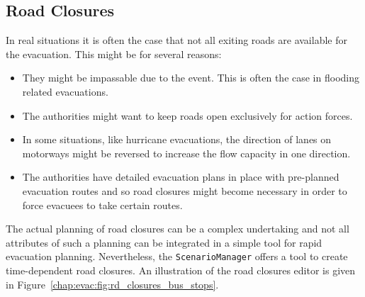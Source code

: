 \subsection{Road Closures}
In real situations it is often the case that not all exiting roads are available for the evacuation. This might be for several reasons:
\begin{itemize}
\item They might be impassable due to the event. This is often the case in flooding related evacuations.
\item The authorities might want to keep roads open exclusively for action forces.
\item In some situations, like hurricane evacuations, the direction of lanes on motorways might be reversed to increase the flow capacity in one direction.
\item The authorities have detailed evacuation plans in place with pre-planned evacuation routes and so road closures might become necessary in order to force evacuees to take certain routes.

\end{itemize}
The actual planning of road closures can be a complex undertaking and not all attributes of such a planning can be integrated in a simple tool for rapid evacuation planning. Nevertheless, the  \verb+ScenarioManager+ offers a tool to create time-dependent road closures. An illustration of the road closures editor is given in Figure~\ref{chap:evac:fig:rd_closures_bus_stops}.

